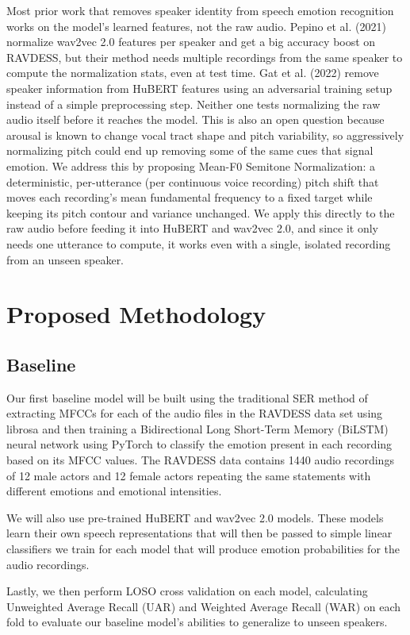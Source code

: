 \documentclass[11pt, letterpaper]{article}
\begin{document}
Most prior work that removes speaker identity from speech emotion recognition works on the model's learned features, not the raw audio. Pepino et al. (2021) normalize wav2vec 2.0 features per speaker and get a big accuracy boost on RAVDESS, but their method needs multiple recordings from the same speaker to compute the normalization stats, even at test time. Gat et al. (2022) remove speaker information from HuBERT features using an adversarial training setup instead of a simple preprocessing step. Neither one tests normalizing the raw audio itself before it reaches the model. This is also an open question because arousal is known to change vocal tract shape and pitch variability, so aggressively normalizing pitch could end up removing some of the same cues that signal emotion. We address this by proposing Mean-F0 Semitone Normalization: a deterministic, per-utterance (per continuous voice recording) pitch shift that moves each recording's mean fundamental frequency to a fixed target while keeping its pitch contour and variance unchanged. We apply this directly to the raw audio before feeding it into HuBERT and wav2vec 2.0, and since it only needs one utterance to compute, it works even with a single, isolated recording from an unseen speaker.

\section{Proposed Methodology}

\subsection{Baseline}

Our first baseline model will be built using the traditional SER method of extracting MFCCs for each of the audio files in the RAVDESS data set using librosa and then training a Bidirectional Long Short-Term Memory (BiLSTM) neural network using PyTorch to classify the emotion present in each recording based on its MFCC values. The RAVDESS data contains 1440 audio recordings of 12 male actors and 12 female actors repeating the same statements with different emotions and emotional intensities.

We will also use pre-trained HuBERT and wav2vec 2.0 models. These models learn their own speech representations that will then be passed to simple linear classifiers we train for each model that will produce emotion probabilities for the audio recordings.

Lastly, we then perform LOSO cross validation on each model, calculating Unweighted Average Recall (UAR) and Weighted Average Recall (WAR) on each fold to evaluate our baseline model's abilities to generalize to unseen speakers.
\end{document}
